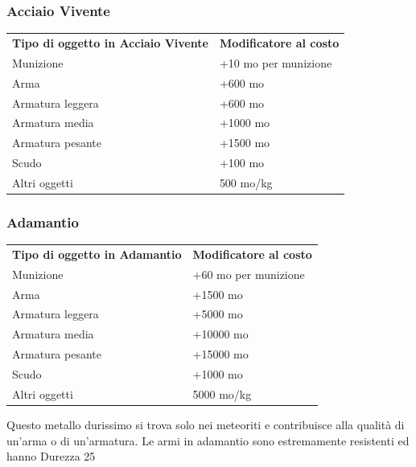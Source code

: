 \documentclass[a4paper,11pt,twoside,openany]{book}
\begin{document}
\subsubsection{Acciaio Vivente}

\label{acciaio-vivente}

\begin{tabular}{ll}
	\toprule
	\textbf{Tipo di oggetto in Acciaio Vivente} & \textbf{Modificatore al costo}\\
	Munizione                         & +10 mo per munizione\\
	Arma                              & +600 mo\\
	Armatura leggera                  & +600 mo\\
	Armatura media                    & +1000 mo\\
	Armatura pesante                  & +1500 mo\\
	Scudo                             & +100 mo\\
	Altri oggetti                     & 500 mo/kg\\
\end{tabular}

\subsubsection{Adamantio}

\label{adamantio}

\begin{tabular}{ll}
	\toprule
	\textbf{Tipo di oggetto in Adamantio} & \textbf{Modificatore al costo}\\
	Munizione                   & +60 mo per munizione\\
	Arma                        & +1500 mo\\
	Armatura leggera            & +5000 mo\\
	Armatura media              & +10000 mo\\
	Armatura pesante            & +15000 mo\\
	Scudo                       & +1000 mo\\
	Altri oggetti               & 5000 mo/kg\\
\end{tabular}

Questo metallo durissimo si trova solo nei meteoriti e contribuisce alla qualità di un'arma o di un'armatura. Le armi in adamantio sono estremamente resistenti ed hanno Durezza 25
\end{document}
